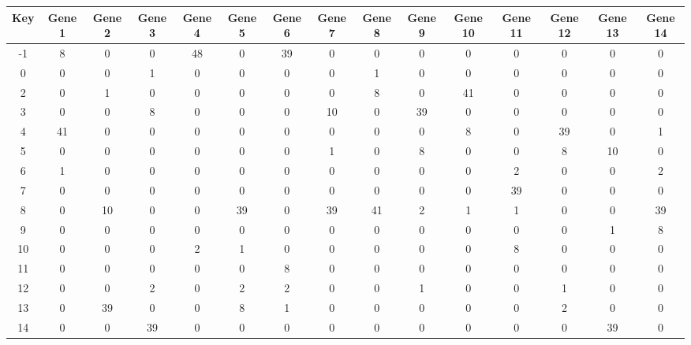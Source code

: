 \begin{tabular}{|c|c|c|c|c|c|c|c|c|c|c|c|c|c|c|}
\hline
Key & Gene 1 & Gene 2 & Gene 3 & Gene 4 & Gene 5 & Gene 6 & Gene 7 & Gene 8 & Gene 9 & Gene 10 & Gene 11 & Gene 12 & Gene 13 & Gene 14 \\
\hline
-1 & 8 & 0 & 0 & 48 & 0 & 39 & 0 & 0 & 0 & 0 & 0 & 0 & 0 & 0 \\
0 & 0 & 0 & 1 & 0 & 0 & 0 & 0 & 1 & 0 & 0 & 0 & 0 & 0 & 0 \\
2 & 0 & 1 & 0 & 0 & 0 & 0 & 0 & 8 & 0 & 41 & 0 & 0 & 0 & 0 \\
3 & 0 & 0 & 8 & 0 & 0 & 0 & 10 & 0 & 39 & 0 & 0 & 0 & 0 & 0 \\
4 & 41 & 0 & 0 & 0 & 0 & 0 & 0 & 0 & 0 & 8 & 0 & 39 & 0 & 1 \\
5 & 0 & 0 & 0 & 0 & 0 & 0 & 1 & 0 & 8 & 0 & 0 & 8 & 10 & 0 \\
6 & 1 & 0 & 0 & 0 & 0 & 0 & 0 & 0 & 0 & 0 & 2 & 0 & 0 & 2 \\
7 & 0 & 0 & 0 & 0 & 0 & 0 & 0 & 0 & 0 & 0 & 39 & 0 & 0 & 0 \\
8 & 0 & 10 & 0 & 0 & 39 & 0 & 39 & 41 & 2 & 1 & 1 & 0 & 0 & 39 \\
9 & 0 & 0 & 0 & 0 & 0 & 0 & 0 & 0 & 0 & 0 & 0 & 0 & 1 & 8 \\
10 & 0 & 0 & 0 & 2 & 1 & 0 & 0 & 0 & 0 & 0 & 8 & 0 & 0 & 0 \\
11 & 0 & 0 & 0 & 0 & 0 & 8 & 0 & 0 & 0 & 0 & 0 & 0 & 0 & 0 \\
12 & 0 & 0 & 2 & 0 & 2 & 2 & 0 & 0 & 1 & 0 & 0 & 1 & 0 & 0 \\
13 & 0 & 39 & 0 & 0 & 8 & 1 & 0 & 0 & 0 & 0 & 0 & 2 & 0 & 0 \\
14 & 0 & 0 & 39 & 0 & 0 & 0 & 0 & 0 & 0 & 0 & 0 & 0 & 39 & 0 \\
\hline
\end{tabular}